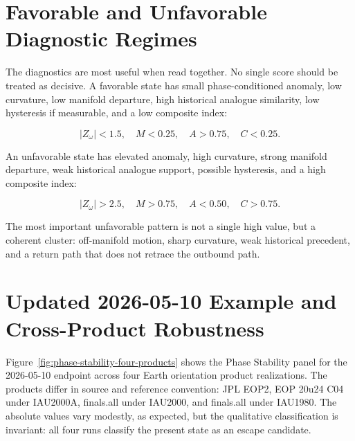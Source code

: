 \documentclass[11pt]{article}
\begin{document}
\section{Favorable and Unfavorable Diagnostic Regimes}

The diagnostics are most useful when read together. No single score should be treated as decisive. A favorable state has small phase-conditioned anomaly, low curvature, low manifold departure, high historical analogue similarity, low hysteresis if measurable, and a low composite index:

\begin{equation}
|Z_{\omega}| < 1.5,\quad
M < 0.25,\quad
A > 0.75,\quad
C < 0.25.
\end{equation}

An unfavorable state has elevated anomaly, high curvature, strong manifold departure, weak historical analogue support, possible hysteresis, and a high composite index:

\begin{equation}
|Z_{\omega}| > 2.5,\quad
M > 0.75,\quad
A < 0.50,\quad
C > 0.75.
\end{equation}

The most important unfavorable pattern is not a single high value, but a coherent cluster: off-manifold motion, sharp curvature, weak historical precedent, and a return path that does not retrace the outbound path.

\section{Updated 2026-05-10 Example and Cross-Product Robustness}

Figure~\ref{fig:phase-stability-four-products} shows the Phase Stability panel for the 2026-05-10 endpoint across four Earth orientation product realizations. The products differ in source and reference convention: JPL EOP2, EOP 20u24 C04 under IAU2000A, finals.all under IAU2000, and finals.all under IAU1980. The absolute values vary modestly, as expected, but the qualitative classification is invariant: all four runs classify the present state as an escape candidate.
\end{document}
